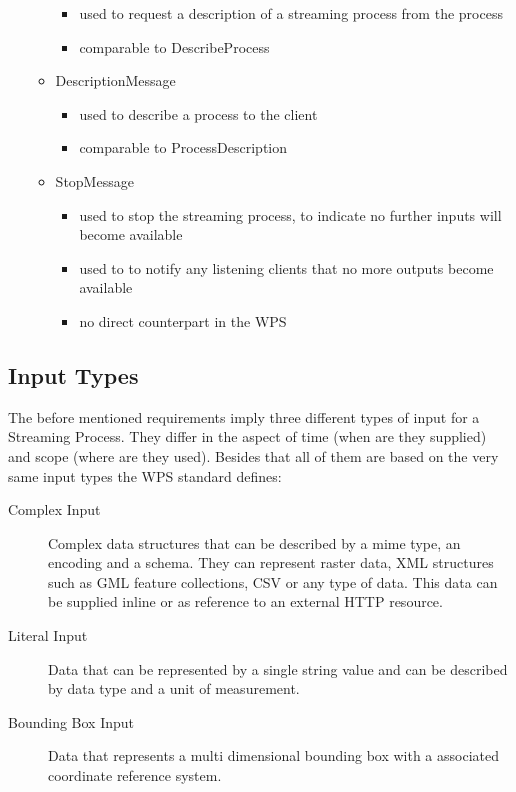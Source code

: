 \begin{itemize}
\begin{itemize}
				\begin{itemize}
					\item used to request a description of a streaming process from the process
					\item comparable to DescribeProcess
				\end{itemize}
				\item DescriptionMessage

				\begin{itemize}
					\item used to describe a process to the client
					\item comparable to ProcessDescription
				\end{itemize}
				\item StopMessage

				\begin{itemize}
					\item used to stop the streaming process, to indicate no further inputs will become available
					\item used to to notify any listening clients that no more outputs become available
					\item no direct counterpart in the WPS
				\end{itemize}
			\end{itemize}
		\end{itemize}
	\subsection{Input Types}
		\label{sec:streaming:input}
		The before mentioned requirements imply three different types of input for a Streaming Process. They differ in the aspect of time (when are they supplied) and scope (where are they used). Besides that all of them are based on the very same input types the \ac{WPS} standard defines:
		\begin{description}
			\item[Complex Input] Complex data structures that can be described by a mime type, an encoding and a schema. They can represent raster data, XML structures such as GML feature collections, CSV or any type of data. This data can be supplied inline or as reference to an external HTTP resource.
			\item[Literal Input] Data that can be represented by a single string value and can be described by data type and a unit of measurement.
			\item[Bounding Box Input] Data that represents a multi dimensional bounding box with a associated coordinate reference system.
		\end{description}
